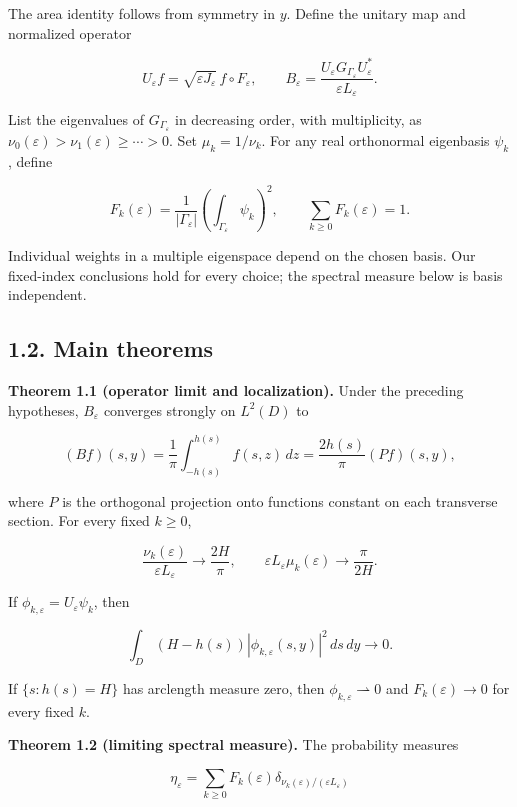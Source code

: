 \documentclass[11pt]{article}
\begin{document}
The area identity follows from symmetry in \(y\). Define the unitary map
and normalized operator

\[
U_\varepsilon f=\sqrt{\varepsilon J_\varepsilon}\,f\circ F_\varepsilon,
\qquad
B_\varepsilon=\frac{U_\varepsilon G_{\Gamma_\varepsilon}U_\varepsilon^*}
 {\varepsilon L_\varepsilon}.
\tag{1.5}
\]

List the eigenvalues of \(G_{\Gamma_\varepsilon}\) in decreasing order,
with multiplicity, as
\(\nu_0(\varepsilon)>\nu_1(\varepsilon)\ge\cdots>0\). Set
\(\mu_k=1/\nu_k\). For any real orthonormal eigenbasis \(\psi_k\),
define

\[
F_k(\varepsilon)=\frac{1}{|\Gamma_\varepsilon|}
 \left(\int_{\Gamma_\varepsilon}\psi_k\right)^2,
\qquad \sum_{k\ge0}F_k(\varepsilon)=1.
\tag{1.6}
\]

Individual weights in a multiple eigenspace depend on the chosen basis.
Our fixed-index conclusions hold for every choice; the spectral measure
below is basis independent.

\subsection{1.2. Main theorems}\label{main-theorems}

\textbf{Theorem 1.1 (operator limit and localization).} Under the
preceding hypotheses, \(B_\varepsilon\) converges strongly on \(L^2(D)\)
to

\[
(Bf)(s,y)=\frac1\pi\int_{-h(s)}^{h(s)}f(s,z)\,dz
 =\frac{2h(s)}\pi(Pf)(s,y),
\tag{1.7}
\]

where \(P\) is the orthogonal projection onto functions constant on each
transverse section. For every fixed \(k\ge0\),

\[
\frac{\nu_k(\varepsilon)}{\varepsilon L_\varepsilon}
 \longrightarrow\frac{2H}\pi,
\qquad
\varepsilon L_\varepsilon\mu_k(\varepsilon)
 \longrightarrow\frac\pi{2H}.
\tag{1.8}
\]

If \(\phi_{k,\varepsilon}=U_\varepsilon\psi_k\), then

\[
\int_D (H-h(s))|\phi_{k,\varepsilon}(s,y)|^2\,ds\,dy\longrightarrow0.
\tag{1.9}
\]

If \(\{s:h(s)=H\}\) has arclength measure zero, then
\(\phi_{k,\varepsilon}\rightharpoonup0\) and \(F_k(\varepsilon)\to0\)
for every fixed \(k\).

\textbf{Theorem 1.2 (limiting spectral measure).} The probability
measures

\[
\eta_\varepsilon=\sum_{k\ge0}F_k(\varepsilon)
 \delta_{\nu_k(\varepsilon)/(\varepsilon L_\varepsilon)}
\tag{1.10}
\]
\end{document}
